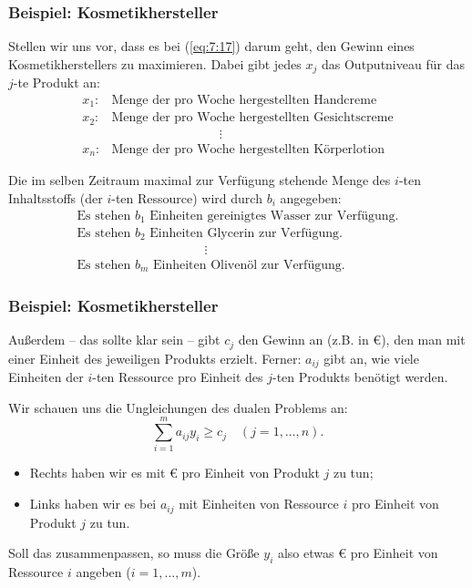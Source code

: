 \documentclass[smaller]{beamer}
\begin{document}
\begin{frame}
 \frametitle{Beispiel: Kosmetikhersteller}
 Stellen wir uns vor, dass es bei (\ref{eq:7:17}) darum geht, den Gewinn eines Kosmetikherstellers zu maximieren. Dabei gibt jedes $x_j$ das \alert{Outputniveau für das $j$-te Produkt} an:
 \[
\begin{array}{rl}
x_1: & \text{Menge der pro Woche hergestellten Handcreme} \\
x_2: & \text{Menge der pro Woche hergestellten Gesichtscreme} \\
& \qquad\qquad\qquad\qquad\ \ \vdots \\
x_n: & \text{Menge der pro Woche hergestellten Körperlotion}
\end{array}
\]

Die im selben Zeitraum maximal zur Verfügung stehende Menge des $i$-ten Inhaltsstoffs (der \alert{$i$-ten Ressource}) wird durch $b_i$ angegeben:
\[
\begin{array}{l}
\text{Es stehen $b_1$ Einheiten gereinigtes Wasser zur Verfügung.} \\
\text{Es stehen $b_2$ Einheiten Glycerin zur Verfügung.} \\
\qquad\qquad\qquad\qquad\qquad \vdots \\
\text{Es stehen $b_m$ Einheiten Olivenöl zur Verfügung.}
\end{array}
\]
\end{frame}

\begin{frame}
 \frametitle{Beispiel: Kosmetikhersteller}
 Außerdem -- das sollte klar sein -- gibt $c_j$ den Gewinn an (z.B. in \euro), den man mit einer Einheit des jeweiligen Produkts erzielt. Ferner: $a_{ij}$ gibt an, wie viele Einheiten der $i$-ten Ressource pro Einheit des $j$-ten Produkts benötigt werden.

Wir schauen uns die Ungleichungen des dualen Problems an:
\begin{equation}
\label{eq:7:18}
\sum\limits_{i=1}^{m}{a_{ij}y_i} \geq c_j \quad (j=1,\ldots,n).
\end{equation}

\begin{itemize}
\item \alert{Rechts} haben wir es mit {\euro} pro Einheit von Produkt $j$ zu tun;
\item \alert{Links} haben wir es bei $a_{ij}$ mit Einheiten von Ressource $i$ pro Einheit von Produkt $j$ zu tun.
\end{itemize}
\alert{Soll das zusammenpassen, so muss die Größe $y_i$ also etwas {\euro} pro Einheit von Ressource $i$ angeben ($i=1,\ldots,m$).}

\end{frame}
\end{document}

